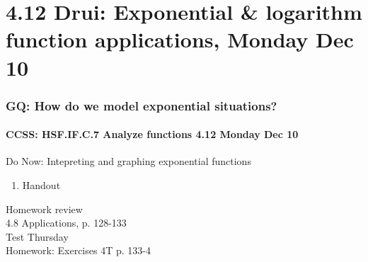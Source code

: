 \documentclass{beamer}
\begin{document}
  \section{4.12 Drui: Exponential \& logarithm function applications, Monday Dec 10}
    \frame
    {
      \frametitle{GQ: How do we model exponential situations?}
      \framesubtitle{CCSS: HSF.IF.C.7 Analyze functions    \alert{4.12 Monday Dec 10}}

      \begin{block}{Do Now: Intepreting and graphing exponential functions}
        \begin{enumerate}
            \item Handout
        \end{enumerate}
      \end{block}
      Homework review \\
      4.8 Applications, p. 128-133\\ \bigskip
      \alert{Test Thursday} \\[0.5cm]
      Homework: Exercises 4T p. 133-4
    }
\end{document}
